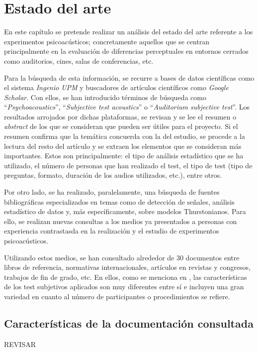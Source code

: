 \documentclass[11pt,a4paper]{book}
\author{Víctor de Tejada Molera}
\begin{document}
\chapter{Estado del arte}
    En este capítulo se pretende realizar un análisis del estado del arte referente a los experimentos psicoacústicos; concretamente aquellos que se centran principalmente en la evaluación de diferencias perceptuales en entornos cerrados como auditorios, cines, salas de conferencias, etc.
    
    Para la búsqueda de esta información, se recurre a bases de datos científicas como el sistema \textit{Ingenio UPM} y buscadores de artículos científicos como \textit{Google Scholar}. Con ellos, se han introducido términos de búsqueda como ``\textit{Psychoacoustics}'', ``\textit{Subjective test acoustics}'' o ``\textit{Auditorium subjective test}''. Los resultados arrojados por dichas plataformas, se revisan y se lee el resumen o \textit{abstract} de los que se consideran que pueden ser útiles para el proyecto. Si el resumen confirma que la temática concuerda con la del estudio, se procede a la lectura del resto del artículo y se extraen los elementos que se consideran más importantes. Estos son principalmente: el tipo de análisis estadístico que se ha utilizado, el número de personas que han realizado el test, el tipo de test (tipo de preguntas, formato, duración de los audios utilizados, etc.), entre otros.
    
    Por otro lado, se ha realizado, paralelamente, una búsqueda de fuentes bibliográficas especializados en temas como de detección de señales, análisis estadístico de datos y, más específicamente, sobre modelos Thurstonianos. Para ello, se realizan nuevas consultas a los medios ya presentados a personas con experiencia contrastasda en la realización y el estudio de experimentos psicoacústicos.\newline
    
    Utilizando estos medios, se han consultado alrededor de 30 documentos entre libros de referencia, normativas internacionales, artículos en revistas y congresos, trabajos de fin de grado, etc. En ellos, como se menciona en \cite{Tejada2020}, las características de los test subjetivos aplicados son muy diferentes entre sí e incluyen una gran variedad en cuanto al número de participantes o procedimientos se refiere.
    
    \section{Características de la documentación consultada} REVISAR
    
\end{document}
